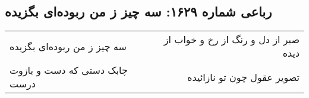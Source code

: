 \begin{center}
\section*{رباعی شماره ۱۶۲۹: سه چیز ز من ربوده‌ای بگزیده}
\label{sec:1629}
\begin{longtable}{l p{0.5cm} r}
سه چیز ز من ربوده‌ای بگزیده
&&
صبر از دل و رنگ از رخ و خواب از دیده
\\
چابک دستی که دست و بازوت درست
&&
تصویر عقول چون تو نازائیده
\\
\end{longtable}
\end{center}
